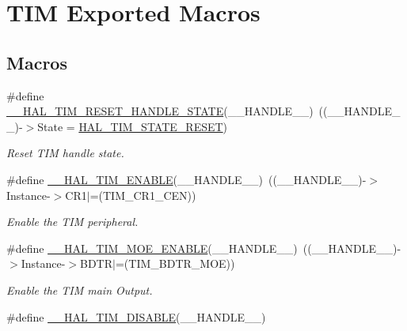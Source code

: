 \hypertarget{group___t_i_m___exported___macros}{}\section{T\+IM Exported Macros}
\label{group___t_i_m___exported___macros}
\subsection*{Macros}
\begin{DoxyCompactItemize}
\item 
\#define \hyperlink{group___t_i_m___exported___macros_gace20fd4e38231b9682fbc83a80ec19a3}{\+\_\+\+\_\+\+H\+A\+L\+\_\+\+T\+I\+M\+\_\+\+R\+E\+S\+E\+T\+\_\+\+H\+A\+N\+D\+L\+E\+\_\+\+S\+T\+A\+TE}(\+\_\+\+\_\+\+H\+A\+N\+D\+L\+E\+\_\+\+\_\+)~((\+\_\+\+\_\+\+H\+A\+N\+D\+L\+E\+\_\+\+\_\+)-\/$>$State = \hyperlink{group___t_i_m___exported___types_ggae0994cf5970e56ca4903e9151f40010ca28011b79e60b74a6c55947c505c51cbc}{H\+A\+L\+\_\+\+T\+I\+M\+\_\+\+S\+T\+A\+T\+E\+\_\+\+R\+E\+S\+ET})
\begin{DoxyCompactList}\small\item\em Reset T\+IM handle state. \end{DoxyCompactList}\item 
\#define \hyperlink{group___t_i_m___exported___macros_ga1a90544705059e9f19f991651623b0c0}{\+\_\+\+\_\+\+H\+A\+L\+\_\+\+T\+I\+M\+\_\+\+E\+N\+A\+B\+LE}(\+\_\+\+\_\+\+H\+A\+N\+D\+L\+E\+\_\+\+\_\+)~((\+\_\+\+\_\+\+H\+A\+N\+D\+L\+E\+\_\+\+\_\+)-\/$>$Instance-\/$>$C\+R1$\vert$=(T\+I\+M\+\_\+\+C\+R1\+\_\+\+C\+EN))
\begin{DoxyCompactList}\small\item\em Enable the T\+IM peripheral. \end{DoxyCompactList}\item 
\#define \hyperlink{group___t_i_m___exported___macros_ga04890dcef3ed061854721a3672585607}{\+\_\+\+\_\+\+H\+A\+L\+\_\+\+T\+I\+M\+\_\+\+M\+O\+E\+\_\+\+E\+N\+A\+B\+LE}(\+\_\+\+\_\+\+H\+A\+N\+D\+L\+E\+\_\+\+\_\+)~((\+\_\+\+\_\+\+H\+A\+N\+D\+L\+E\+\_\+\+\_\+)-\/$>$Instance-\/$>$B\+D\+TR$\vert$=(T\+I\+M\+\_\+\+B\+D\+T\+R\+\_\+\+M\+OE))
\begin{DoxyCompactList}\small\item\em Enable the T\+IM main Output. \end{DoxyCompactList}\item 
\#define \hyperlink{group___t_i_m___exported___macros_ga6a5e653e0e06a04151b74eb1a5f96eb6}{\+\_\+\+\_\+\+H\+A\+L\+\_\+\+T\+I\+M\+\_\+\+D\+I\+S\+A\+B\+LE}(\+\_\+\+\_\+\+H\+A\+N\+D\+L\+E\+\_\+\+\_\+)

\end{DoxyCompactItemize}
